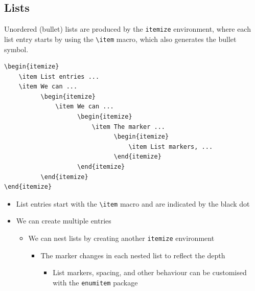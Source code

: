 \documentclass[11pt, twoside]{article}
\begin{document}
\subsection{Lists}
Unordered (bullet) lists are produced by the \lstinline{itemize} environment,
where each list entry starts by using the \lstinline{\item} macro, which
also generates the bullet symbol.
\begin{lstlisting}
\begin{itemize}
    \item List entries ...
    \item We can ...
          \begin{itemize}
              \item We can ...
                    \begin{itemize}
                        \item The marker ...
                              \begin{itemize}
                                  \item List markers, ...
                              \end{itemize}
                    \end{itemize}
          \end{itemize}
\end{itemize}
\end{lstlisting}
\begin{outputbox}
    \begin{itemize}
        \item List entries start with the \lstinline{\item} macro and are indicated by the black dot
        \item We can create multiple entries
              \begin{itemize}
                  \item We can nest lists by creating another \lstinline{itemize} environment
                        \begin{itemize}
                            \item The marker changes in each nested list to reflect the depth
                                  \begin{itemize}
                                      \item List markers, spacing, and other behaviour can be customised with the \linebreak \lstinline{enumitem} package
                                  \end{itemize}
                        \end{itemize}
              \end{itemize}
    \end{itemize}
\end{outputbox}
\end{document}

